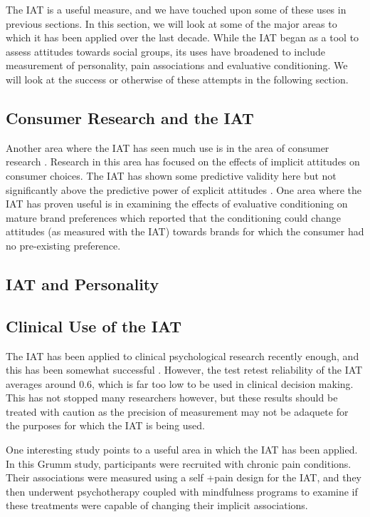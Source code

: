 The IAT is a useful measure, and we have touched upon some of these uses in previous sections. In this section, we will look at some of the major areas to which it has been applied over the last decade. While the IAT began as a tool to assess attitudes towards social groups, its uses have broadened to include measurement of personality, pain associations and evaluative conditioning. We will look at the success or otherwise of these attempts in the following section. 

\subsection{Consumer Research and the IAT}
\label{sec:cons-rese-iat}

Another area where the IAT has seen much use is in the area of consumer research \cite{Lane2007,Maison2001}. Research in this area has focused on the effects of implicit attitudes on consumer choices. The IAT has shown some predictive validity here \cite{Maison2004}  but not significantly above the predictive power of explicit attitudes \cite{Greenwald2009}. One area where the IAT has proven useful is in examining the effects of evaluative conditioning on mature brand preferences \cite{Gibson2008} which reported that the conditioning could change attitudes (as measured with the IAT) towards brands for which the consumer had no pre-existing preference.

\subsection{IAT and Personality}
\label{sec:iat-personality}

\subsection{Clinical Use of the IAT}
\label{sec:clinical-use-iat}

The IAT has been applied to clinical psychological research recently enough, and this has been somewhat successful \cite{DeHouwer2002}. However, the test retest reliability of the IAT averages around 0.6, which is far too low to be used in clinical decision making. This has not stopped many researchers however, but these results should be treated with caution as the precision of measurement may not be adaquete for the purposes for which the IAT is being used. 

One interesting study \cite{Grumm2008} points to a useful area in which the IAT has been applied. In this Grumm study, participants were recruited with chronic pain conditions. Their associations were measured using a self +pain design for the IAT, and they then underwent psychotherapy coupled with mindfulness programs to examine if these treatments were capable of changing their implicit associations. 

